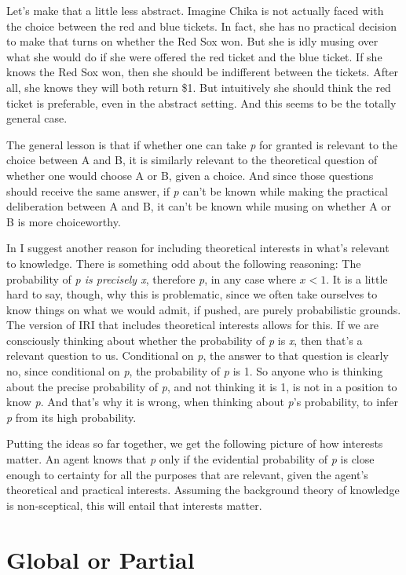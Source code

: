 Let's make that a little less abstract. Imagine Chika is not actually faced with the choice between the red and blue tickets. In fact, she has no practical decision to make that turns on whether the Red Sox won. But she is idly musing over what she would do if she were offered the red ticket and the blue ticket. If she knows the Red Sox won, then she should be indifferent between the tickets. After all, she knows they will both return \$1. But intuitively she should think the red ticket is preferable, even in the abstract setting. And this seems to be the totally general case.

The general lesson is that if whether one can take \emph{p} for granted is relevant to the choice between A and B, it is similarly relevant to the theoretical question of whether one would choose A or B, given a choice. And since those questions should receive the same answer, if \emph{p} can't be known while making the practical deliberation between A and B, it can't be known while musing on whether A or B is more choiceworthy. 

In  \citet{Weatherson2012} I suggest another reason for including theoretical interests in what's relevant to knowledge. There is something odd about the following reasoning: The probability of \emph{p is precisely x}, therefore \emph{p}, in any case where $x < 1$. It is a little hard to say, though, why this is problematic, since we often take ourselves to know things on what we would admit, if pushed, are purely probabilistic grounds. The version of IRI that includes theoretical interests allows for this. If we are consciously thinking about whether the probability of \emph{p} is \emph{x}, then that's a relevant question to us. Conditional on \emph{p}, the answer to that question is clearly no, since conditional on \emph{p}, the probability of \emph{p} is 1. So anyone who is thinking about the precise probability of \emph{p}, and not thinking it is 1, is not in a position to know \emph{p}. And that's why it is wrong, when thinking about \emph{p}'s probability, to infer \emph{p} from its high probability.

Putting the ideas so far together, we get the following picture of how interests matter. An agent knows that \emph{p} only if the evidential probability of \emph{p} is close enough to certainty for all the purposes that are relevant, given the agent's theoretical and practical interests. Assuming the background theory of knowledge is non-sceptical, this will entail that interests matter.

\section{Global or Partial}
\label{globalorpartial}

